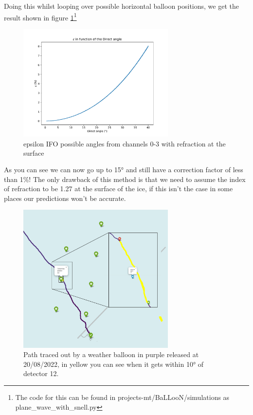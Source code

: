 \documentclass[11pt,a4paper,faculty=we,language=en,doctype=report]{cls/ugent-doc}
\begin{document}
Doing this whilst looping over possible horizontal balloon positions, we get
the result shown in figure \ref{fig:EpsilonIFODirectSnell}\footnote{The code
for this can be found in projects-mt/BaLLooN/simulations as
plane\_wave\_with\_snell.py}
\begin{figure}
	\centering
	\includegraphics[width=0.7\textwidth]{EpsilonIFODirectSnell.pdf}
	\caption{epsilon IFO possible angles from channels 0-3 with refraction at the surface}
	\label{fig:EpsilonIFODirectSnell}
\end{figure}
As you can see we can now go up to 15° and still have a correction factor of less than 1\%!  The
only drawback of this method is that we need to assume the index of refraction
to be 1.27 at the surface of the ice, if this isn't the case in some places our
predictions won't be accurate.

\begin{figure}
  \centering
	\includegraphics[width=0.7\textwidth]{BallonPathAllIllu.pdf}
  \caption{Path traced out by a weather balloon in purple released at 20/08/2022, in yellow you can see when it
  gets within 10° of detector 12.}
  \label{fig:ExampleBalloonPathCrossing12}
\end{figure}
\end{document}
